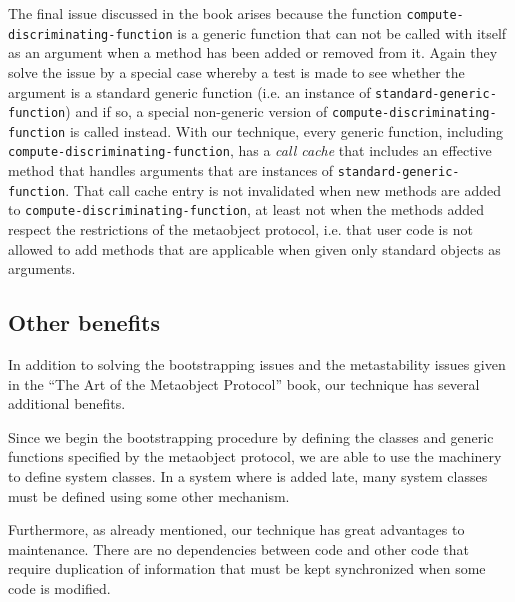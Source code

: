 The final issue discussed in the book arises because the function
\texttt{compute-discriminating-function} is a generic function that
can not be called with itself as an argument when a method has been
added or removed from it.  Again they solve the issue by a special
case whereby a test is made to see whether the argument is a standard
generic function (i.e. an instance of
\texttt{standard-generic-function}) and if so, a special non-generic
version of \texttt{compute-discriminating-function} is called instead.
With our technique, every generic function, including
\texttt{compute-discriminating-function}, has a \emph{call cache} that
includes an effective method that handles arguments that are instances
of \texttt{standard-generic-function}.  That call cache entry is not
invalidated when new methods are added to
\texttt{compute-discriminating-function}, at least not when the
methods added respect the restrictions of the metaobject protocol,
i.e. that user code is not allowed to add methods that are applicable
when given only standard objects as arguments.

\subsection{Other benefits}

In addition to solving the bootstrapping issues and the metastability
issues given in the ``The Art of the Metaobject Protocol'' book, our
technique has several additional benefits.

Since we begin the bootstrapping procedure by
defining the classes and generic functions specified by the metaobject
protocol, we are able to use the \clos{} machinery to define system
classes.  In a system where \clos{} is added late, many system classes
must be defined using some other mechanism.

Furthermore, as already mentioned, our technique has great advantages
to maintenance.  There are no dependencies between \clos{} code and
other code that require duplication of information that must be kept
synchronized when some code is modified.
